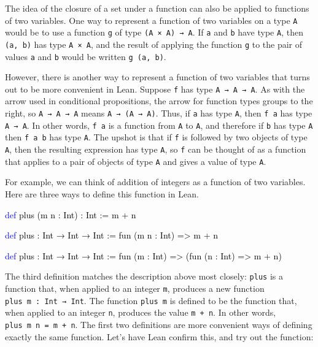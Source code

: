 \documentclass[
  letterpaper,
  DIV=11,
  numbers=noendperiod]{scrreprt}
\newenvironment{Shaded}{\begin{snugshade}}{\end{snugshade}}
\newcommand{\KeywordTok}[1]{\textcolor[rgb]{0.00,0.23,0.31}{#1}}
\newcommand{\NormalTok}[1]{\textcolor[rgb]{0.00,0.23,0.31}{#1}}
\renewcommand{\NormalTok}[1]{\textcolor[HTML]{000000}{#1}}
\renewcommand{\KeywordTok}[1]{\textcolor[HTML]{0000FF}{#1}}
\theoremstyle{remark}
\begin{document}
The idea of the closure of a set under a function can also be applied to
functions of two variables. One way to represent a function of two
variables on a type \texttt{A} would be to use a function \texttt{g} of
type \texttt{(A\ ×\ A)\ →\ A}. If \texttt{a} and \texttt{b} have type
\texttt{A}, then \texttt{(a,\ b)} has type \texttt{A\ ×\ A}, and the
result of applying the function \texttt{g} to the pair of values
\texttt{a} and \texttt{b} would be written \texttt{g\ (a,\ b)}.

However, there is another way to represent a function of two variables
that turns out to be more convenient in Lean. Suppose \texttt{f} has
type \texttt{A\ →\ A\ →\ A}. As with the arrow used in conditional
propositions, the arrow for function types groups to the right, so
\texttt{A\ →\ A\ →\ A} means \texttt{A\ →\ (A\ →\ A)}. Thus, if
\texttt{a} has type \texttt{A}, then \texttt{f\ a} has type
\texttt{A\ →\ A}. In other words, \texttt{f\ a} is a function from
\texttt{A} to \texttt{A}, and therefore if \texttt{b} has type
\texttt{A} then \texttt{f\ a\ b} has type \texttt{A}. The upshot is that
if \texttt{f} is followed by two objects of type \texttt{A}, then the
resulting expression has type \texttt{A}, so \texttt{f} can be thought
of as a function that applies to a pair of objects of type \texttt{A}
and gives a value of type \texttt{A}.

For example, we can think of addition of integers as a function of two
variables. Here are three ways to define this function in Lean.

\begin{Shaded}
\begin{Highlighting}[]
\KeywordTok{def}\NormalTok{ plus (m n : Int) : Int := m + n}

\KeywordTok{def}\NormalTok{ plus\textquotesingle{} : Int → Int → Int := fun (m n : Int) =\textgreater{} m + n}

\KeywordTok{def}\NormalTok{ plus\textquotesingle{}\textquotesingle{} : Int → Int → Int := fun (m : Int) =\textgreater{} (fun (n : Int) =\textgreater{} m + n)}
\end{Highlighting}
\end{Shaded}

The third definition matches the description above most closely:
\texttt{plus\textquotesingle{}\textquotesingle{}} is a function that,
when applied to an integer \texttt{m}, produces a new function
\texttt{plus\textquotesingle{}\textquotesingle{}\ m\ :\ Int\ →\ Int}.
The function \texttt{plus\textquotesingle{}\textquotesingle{}\ m} is
defined to be the function that, when applied to an integer \texttt{n},
produces the value \texttt{m\ +\ n}. In other words,
\texttt{plus\textquotesingle{}\textquotesingle{}\ m\ n\ =\ m\ +\ n}. The
first two definitions are more convenient ways of defining exactly the
same function. Let's have Lean confirm this, and try out the function:
\end{document}
